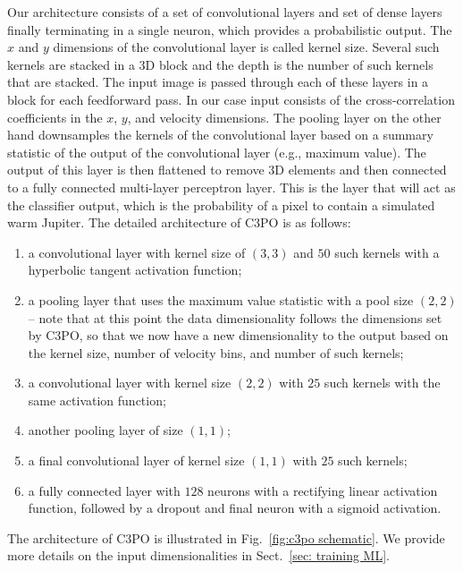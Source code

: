 \documentclass{aa}
\begin{document}
Our architecture consists of a set of convolutional layers and set of dense layers finally terminating in a single neuron, which provides a probabilistic output.
The $x$ and $y$ dimensions of the convolutional layer is called kernel size.
Several such kernels are stacked in a 3D block and the depth is the number of such kernels that are stacked.
The input image is passed through each of these layers in a block for each feedforward pass.
In our case input consists of the cross-correlation coefficients in the $x$, $y$, and velocity dimensions.
The pooling layer on the other hand downsamples the kernels of the convolutional layer based on a summary statistic of the output of the convolutional layer (e.g., maximum value).
The output of this layer is then flattened to remove 3D elements and then connected to a fully connected multi-layer perceptron layer. 
This is the layer that will act as the classifier output, which is the probability of a pixel to contain a simulated warm Jupiter. The detailed architecture of C3PO is as follows:
\begin{enumerate}
    \item a convolutional layer with kernel size of $\left(3,3\right)$ and $50$ such kernels with a hyperbolic tangent activation function;
    \item a pooling layer that uses the maximum value statistic with a pool size $\left(2,2\right)$ -- note that at this point the data dimensionality follows the dimensions set by C3PO, so that we now have a new dimensionality to the output based on the kernel size, number of velocity bins, and number of such kernels;
    \item a convolutional layer with kernel size $\left(2,2\right)$ with $25$ such kernels with the same activation function;
    \item another pooling layer of size $(1,1)$;
    \item a final convolutional layer of kernel size $(1,1)$ with $25$ such kernels;
    \item a fully connected layer with $128$ neurons with a rectifying linear activation function, followed by a dropout and final neuron with a sigmoid activation.
\end{enumerate}
The architecture of C3PO is illustrated in Fig.~\ref{fig:c3po schematic}. We provide more details on the input dimensionalities in Sect.~\ref{sec: training ML}.
\end{document}
